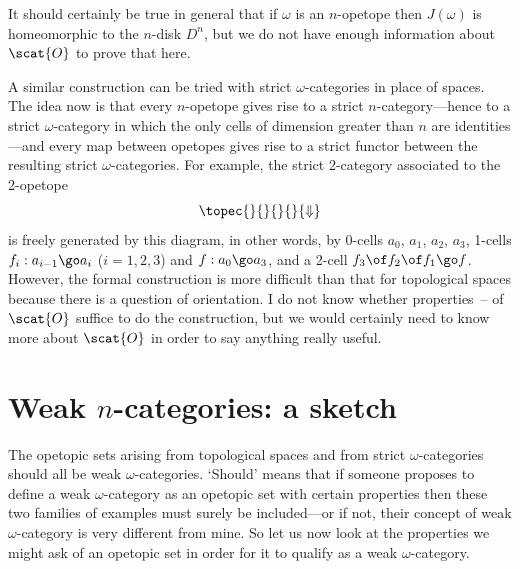 It should certainly be true in general that if $\omega$ is an $n$-opetope
then $J(\omega)$ is homeomorphic to the $n$-disk $D^n$, but we do not have
enough information about $\scat{O}$ to prove that here.

A similar construction can be tried with strict $\omega$-categories in
place of spaces.  The idea now is that every $n$-opetope gives rise to a
strict $n$-category---hence%
%  
%
%
%
%
%
to a strict $\omega$-category in which the only cells of dimension greater
than $n$ are identities---and every map between opetopes gives rise to a
strict functor between the resulting strict $\omega$-categories.  For
example, the strict 2-category associated to the 2-opetope
\[
\topec{}{}{}{}{\Downarrow}
\]
is freely generated by this diagram, in other words, by 0-cells $a_0$,
$a_1$, $a_2$, $a_3$, 1-cells $f_i: a_{i-1} \go a_i$ ($i = 1, 2, 3$) and
$f: a_0 \go a_3$, and a 2-cell $f_3\of f_2\of f_1 \go f$.  However, the
formal construction is more difficult than that for topological spaces
because there is a question of orientation.  I do not know whether
properties~-- of $\scat{O}$
suffice to do the construction, but we would certainly need to know more
about $\scat{O}$ in order to say anything really useful.



\section{Weak $n$-categories: a sketch}

The opetopic sets arising from topological spaces and from strict
$\omega$-categories should all be weak $\omega$-categories.  `Should' means
that if someone proposes to define%
%
% 
a weak $\omega$-category as an opetopic
set with certain properties then these two families of examples must surely
be included---or if not, their concept of weak $\omega$-category is very
different from mine.  So let us now look at the properties we might ask of
an opetopic set in order for it to qualify as a weak $\omega$-category.


